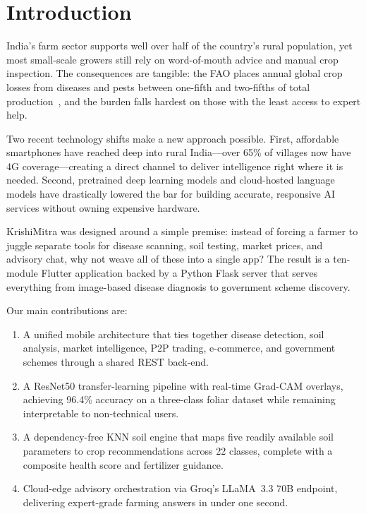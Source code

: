 \documentclass[conference]{IEEEtran}
\begin{document}
\section{Introduction}

India's farm sector supports well over half of the country's rural population, yet most small-scale
growers still rely on word-of-mouth advice and manual crop inspection. The consequences are
tangible: the FAO places annual global crop losses from diseases and pests between one-fifth and
two-fifths of total production~\cite{fao2019}, and the burden falls hardest on those with the least
access to expert help.

Two recent technology shifts make a new approach possible. First, affordable smartphones have
reached deep into rural India---over 65\% of villages now have 4G coverage---creating a direct
channel to deliver intelligence right where it is needed. Second, pretrained deep learning models
and cloud-hosted language models have drastically lowered the bar for building accurate, responsive
AI services without owning expensive hardware.

KrishiMitra was designed around a simple premise: instead of forcing a farmer to juggle separate
tools for disease scanning, soil testing, market prices, and advisory chat, why not weave all of
these into a single app? The result is a ten-module Flutter application backed by a Python Flask
server that serves everything from image-based disease diagnosis to government scheme discovery.

Our main contributions are:
\begin{enumerate}
  \item A unified mobile architecture that ties together disease detection,
  soil analysis, market intelligence, P2P trading, e-commerce, and government
  schemes through a shared REST back-end.
  \item A ResNet50 transfer-learning pipeline with real-time Grad-CAM overlays,
  achieving 96.4\% accuracy on a three-class foliar dataset while remaining
  interpretable to non-technical users.
  \item A dependency-free KNN soil engine that maps five readily available soil
  parameters to crop recommendations across 22 classes, complete with a
  composite health score and fertilizer guidance.
  \item Cloud-edge advisory orchestration via Groq's LLaMA~3.3 70B endpoint,
  delivering expert-grade farming answers in under one second.
\end{enumerate}
\end{document}
